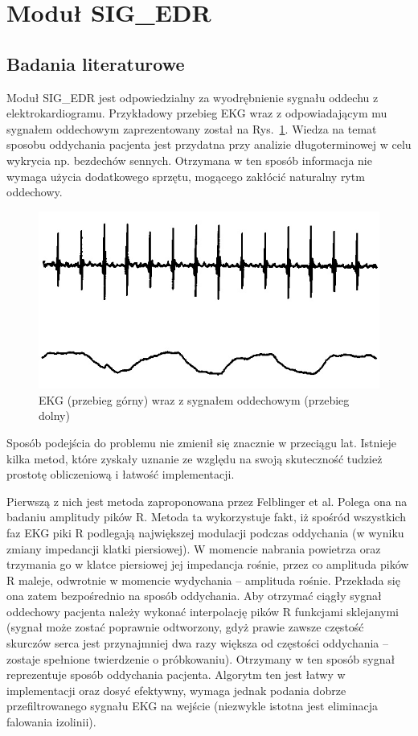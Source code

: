 \section{Moduł SIG\_EDR}
\subsection{Badania literaturowe}
		Moduł SIG\_EDR jest odpowiedzialny za wyodrębnienie sygnału oddechu z elektrokardiogramu. Przykładowy przebieg EKG wraz z odpowiadającym mu sygnałem oddechowym zaprezentowany został na Rys.~\ref{fig:ecg_oddech}. Wiedza na temat sposobu oddychania pacjenta jest przydatna przy analizie długoterminowej w celu wykrycia np. bezdechów sennych. Otrzymana w ten sposób informacja nie wymaga użycia dodatkowego sprzętu, mogącego zakłócić naturalny rytm oddechowy.
\begin{figure}[ht]
\centering
\includegraphics[width=12cm]{SIG_EDR/img/ecg_oddech.jpg}
\caption{EKG (przebieg górny) wraz z sygnałem oddechowym (przebieg dolny)}
\label{fig:ecg_oddech}
\end{figure}
 
		Sposób podejścia do problemu nie zmienił się znacznie w przeciągu lat. Istnieje kilka metod, które zyskały uznanie ze względu na swoją skuteczność tudzież prostotę obliczeniową i łatwość implementacji.
	   
		Pierwszą z nich jest metoda zaproponowana przez Felblinger et al. Polega ona na badaniu amplitudy pików R. Metoda ta wykorzystuje fakt, iż spośród wszystkich faz  EKG piki R podlegają największej modulacji podczas oddychania (w wyniku zmiany impedancji klatki piersiowej). W momencie nabrania powietrza oraz trzymania go w klatce piersiowej jej impedancja rośnie, przez co amplituda pików R maleje, odwrotnie w momencie wydychania – amplituda rośnie. Przekłada się ona zatem bezpośrednio na sposób oddychania. Aby otrzymać ciągły sygnał oddechowy pacjenta należy wykonać interpolację pików R funkcjami sklejanymi (sygnał może zostać poprawnie odtworzony, gdyż prawie zawsze częstość skurczów serca jest przynajmniej dwa razy większa od częstości oddychania – zostaje spełnione twierdzenie o próbkowaniu).  Otrzymany w ten sposób sygnał reprezentuje sposób oddychania pacjenta. Algorytm ten jest łatwy w implementacji oraz dosyć efektywny, wymaga jednak podania dobrze przefiltrowanego sygnału EKG na wejście (niezwykle istotna jest eliminacja falowania izolinii).
	   
